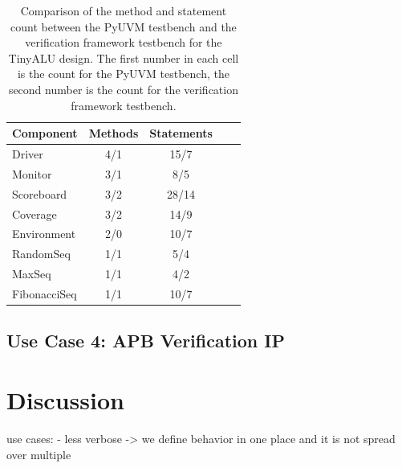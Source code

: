 \begin{table}
\centering
\begin{tabular}{|l|c|c|c|c|}
\hline
\textbf{Component}       & \textbf{Methods} & \textbf{Statements} \\ \hline
Driver          & 4/1             & 15/7 \\ \hline
Monitor         & 3/1             & 8/5    \\ \hline
Scoreboard       & 3/2            & 28/14    \\ \hline
Coverage      & 3/2             & 14/9      \\ \hline
Environment        & 2/0             & 10/7    \\ \hline
RandomSeq   & 1/1 & 5/4 \\ \hline
MaxSeq   & 1/1 & 4/2 \\ \hline
FibonacciSeq   & 1/1 & 10/7 \\ \hline
\end{tabular}
\caption{Comparison of the method and statement count between the PyUVM testbench and the verification framework testbench for the TinyALU design. The first number in each cell is the count for the PyUVM testbench, the second number is the count for the verification framework testbench.}
\label{tab:comparison}
\end{table}




\section{Use Case 4: APB Verification IP} %


\cite{didactic}

\chapter{Discussion} %

use cases:
- less verbose -> we define behavior in one place and it is not spread over multiple

